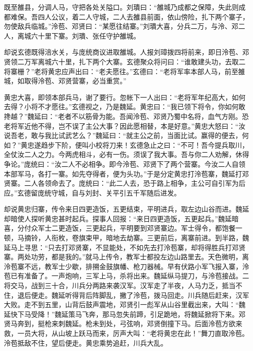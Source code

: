 既至雒县，分调人马，守把各处关隘口。刘璝曰：“雒城乃成都之保障，失此则成都难保。吾四人公议，着二人守城，二人去雒县前面，依山傍险，扎下两个寨子，勿使敌兵临城。”泠苞、邓贤曰：“某愿往结寨。”刘璝大喜，分兵二万，与泠、邓二人，离城六十里下寨。刘璝、张任守护雒城。

却说玄德既得涪水关，与庞统商议进取雒城。人报刘璋拨四将前来，即日泠苞、邓贤领二万军离城六十里，扎下两个大寨。玄德聚众将问曰：“谁敢建头功，去取二将寨栅？”老将黄忠应声出曰：“老夫愿往。”玄德曰：“老将军率本部人马，前至雒城，如取得泠苞、邓贤营寨，必当重赏。”

黄忠大喜，即领本部兵马，谢了要行。忽帐下一人出曰：“老将军年纪高大，如何去得？小将不才愿往。”玄德视之，乃是魏延。黄忠曰：“我已领下将令，你如何敢搀越？”魏延曰：“老者不以筋骨为能。吾闻泠苞、邓贤乃蜀中名将，血气方刚。恐老将军近他不得，岂不误了主公大事？因此愿相替，本是好意。”黄忠大怒曰：“汝说吾老，敢与我比试武艺么？”魏延曰：“就主公之前，当面比试。赢得的便去，何如？”黄忠遂趋步下阶，便叫小校将刀来！玄德急止之曰：“不可！吾今提兵取川，全仗汝二人之力。今两虎相斗，必有一伤。须误了我大事。吾与你二人劝解，休得争论。”庞统曰：“汝二人不必相争。即今泠苞、邓贤下了两个营寨。今汝二人自领本部军马，各打一寨。如先夺得者，便为头功。”于是分定黄忠打泠苞寨，魏延打邓贤寨。二人各领命去了。庞统曰：“此二人去，恐于路上相争，主公可自引军为后应。”玄德留庞统守城，自与刘封、关平引五千军随后进发。

却说黄忠归寨，传令来日四更造饭，五更结束，平明进兵，取左边山谷而进。魏延却暗使人探听黄忠甚时起兵。探事人回报：“来日四更造饭，五更起兵。”魏延暗喜，分付众军士二更造饭，三更起兵，平明要到邓贤寨边。军士得令，都饱餐一顿，马摘铃，人衔枚，卷旗束甲，暗地去劫寨。三更前后，离寨前进。到半路，魏延马上寻思：“只去打邓贤寨，不显能处，不如先去打泠苞寨，却将得胜兵打邓贤寨。两处功劳，都是我的。”就马上传令，教军士都投左边山路里去。天色微明，离泠苞寨不远，教军士少歇，排搠金鼓旗幡、枪刀器械。早有伏路小军飞报入寨，泠苞已有准备了。一声炮响，三军上马，杀将出来。魏延纵马提刀，与泠苞接战。二将交马，战到三十合，川兵分两路来袭汉军。汉军走了半夜，人马力乏，抵当不住，退后便走。魏延听得背后阵脚乱，撇了泠苞，拨马回走。川兵随后赶来，汉军大败。走不到五里，山背后鼓声震地，邓贤引一彪军从山谷里截出来，大叫：“魏延快下马受降！”魏延策马飞奔，那马忽失前蹄，引足跪地，将魏延掀将下来。邓贤马奔到，挺枪来刺魏延。枪未到处，弓弦响，邓贤倒撞下马。后面泠苞方欲来救，一员大将，从山坡上跃马而来，厉声大叫：“老将黄忠在此！”舞刀直取泠苞。泠苞抵敌不住，望后便走。黄忠乘势追赶，川兵大乱。

